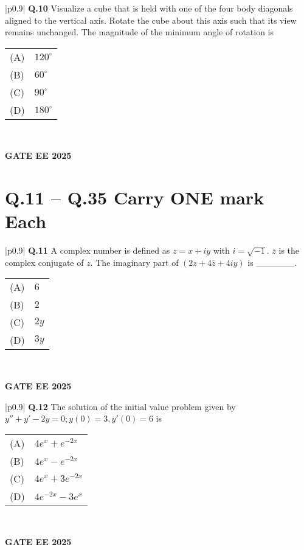 \documentclass{article}
\begin{document}
\begin{table}[h]
\centering
\begin{tabular}{|p{0.9\linewidth}|}
\hline
\textbf{Q.10} Visualize a cube that is held with one of the four body diagonals aligned to the vertical axis. Rotate the cube about this axis such that its view remains unchanged. The magnitude of the minimum angle of rotation is \\
\hline
\begin{tabular}{ll}
(A) & $120^\circ$ \\
(B) & $60^\circ$ \\
(C) & $90^\circ$ \\
(D) & $180^\circ$ \\
\end{tabular} \\
\hline
\end{tabular}
\end{table}
\textbf{GATE EE 2025}

\section*{Q.11 – Q.35 Carry ONE mark Each}

\begin{table}[h]
\centering
\begin{tabular}{|p{0.9\linewidth}|}
\hline
\textbf{Q.11} A complex number is defined as $z = x + iy$ with $i = \sqrt{-1}$. $\bar{z}$ is the complex conjugate of $z$. The imaginary part of $(2z + 4\bar{z} + 4iy)$ is \_\_\_\_\_\_. \\
\hline
\begin{tabular}{ll}
(A) & $6$ \\
(B) & $2$ \\
(C) & $2y$ \\
(D) & $3y$ \\
\end{tabular} \\
\hline
\end{tabular}
\end{table}
\textbf{GATE EE 2025}

\begin{table}[h]
\centering
\begin{tabular}{|p{0.9\linewidth}|}
\hline
\textbf{Q.12} The solution of the initial value problem given by $y'' + y' - 2y = 0; y(0) = 3, y'(0) = 6$ is \\
\hline
\begin{tabular}{ll}
(A) & $4e^x + e^{-2x}$ \\
(B) & $4e^x - e^{-2x}$ \\
(C) & $4e^x + 3e^{-2x}$ \\
(D) & $4e^{-2x} - 3e^x$ \\
\end{tabular} \\
\hline
\end{tabular}
\end{table}
\textbf{GATE EE 2025}
\end{document}

